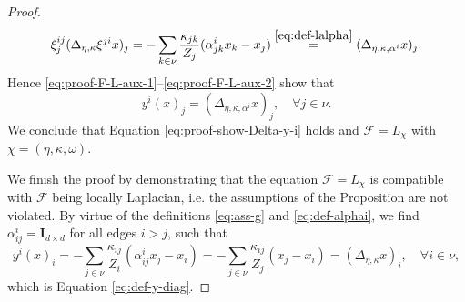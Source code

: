 \documentclass[10pt,a4paper]{amsart}
\newcommand{\II}{\mathbf{I}_{d \times d}}
\newcommand{\mc}[1]{\mathcal{#1}}
\begin{document}
\begin{proof}
\begin{equation}
			\xi^{ij}_{j}(\Delta_{\eta,\kappa} \xi^{ji}x)_{j}
			= -\sum_{k \in \nu} \frac{\kappa_{jk}}{Z_{j}}(\alpha_{jk}^{i} x_{k} - x_j)
			\overset{\eqref{eq:def-lalpha}}{=} (\Delta_{\eta,\kappa,\alpha^{i}}x)_{j}.
		\end{equation}
		Hence \eqref{eq:proof-F-L-aux-1}--\eqref{eq:proof-F-L-aux-2} show that
		\begin{equation}
			y^{i}(x)_{j} = (\Delta_{\eta,\kappa,\alpha^{i}}x)_{j}, \quad \forall j \in \nu.
		\end{equation}
		We conclude that Equation \eqref{eq:proof-show-Delta-y-i} holds and $\mc{F} = L_{\chi}$ with $\chi=(\eta,\kappa,\omega)$.

		We finish the proof by demonstrating that the equation $\mc{F} = L_{\chi}$ is compatible with $\mc{F}$ being locally Laplacian, i.e. the assumptions of the Proposition are not violated. By virtue of the definitions \eqref{eq:ass-g} and \eqref{eq:def-alphai}, we find $\alpha^{i}_{ij} =\II$ for all edges $i>j$, such that
			\begin{equation}
				y^{i}(x)_{i}
				= - \sum_{j\in\nu}\frac{\kappa_{ij}}{Z_{i}}(\alpha^{i}_{ij} x_{j} - x_{i})
				= - \sum_{j \in \nu} \frac{\kappa_{ij}}{Z_{j}}(x_{j} - x_{i})
				= (\Delta_{\eta,\kappa} x)_{i}, \quad \forall i \in \nu,
			\end{equation}
		which is Equation \eqref{eq:def-y-diag}.
	\end{proof}
\end{document}
